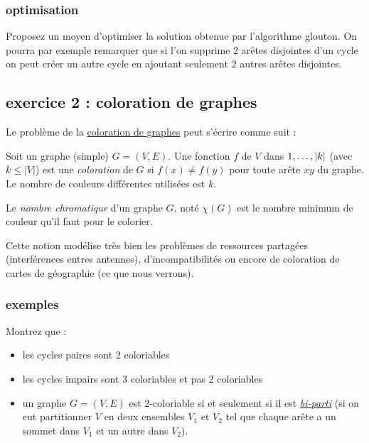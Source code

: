 \documentclass[
]{article}
\providecommand{\tightlist}{%
  \setlength{\itemsep}{0pt}\setlength{\parskip}{0pt}}
\begin{document}
\hypertarget{optimisation}{%
\subsubsection{optimisation}\label{optimisation}}

Proposez un moyen d'optimiser la solution obtenue par l'algorithme
glouton. On pourra par exemple remarquer que si l'on supprime 2 arêtes
disjointes d'un cycle on peut créer un autre cycle en ajoutant seulement
2 autres arêtes disjointes.

\hypertarget{exercice-2-coloration-de-graphes}{%
\subsection{exercice 2 : coloration de
graphes}\label{exercice-2-coloration-de-graphes}}

Le problème de la
\href{https://fr.wikipedia.org/wiki/Coloration_de_graphe}{coloration de
graphes} peut s'écrire comme suit :

Soit un graphe (simple) \(G = (V, E)\). Une fonction \(f\) de \(V\) dans
\(\\{1, \dots, \vert k \vert \\}\) (avec \(k \leq \vert V \vert\)) est
une \emph{coloration} de \(G\) si \(f(x) \neq f(y)\) pour toute arête
\(xy\) du graphe. Le nombre de couleurs différentes utilisées est \(k\).

Le \emph{nombre chromatique} d'un graphe \(G\), noté \(\chi(G)\) est le
nombre minimum de couleur qu'il faut pour le colorier.

Cette notion modélise très bien les problèmes de ressources partagées
(interférences entres antennes), d'incompatibilités ou encore de
coloration de cartes de géographie (ce que nous verrons).

\hypertarget{exemples}{%
\subsubsection{exemples}\label{exemples}}

Montrez que :

\begin{itemize}
\tightlist
\item
  les cycles paires sont 2 coloriables
\item
  les cycles impairs sont 3 coloriables et pas 2 coloriables
\item
  un graphe \(G=(V, E)\) est 2-coloriable si et seulement si il est
  \href{https://fr.wikipedia.org/wiki/Graphe_biparti}{\emph{bi-parti}}
  (si on eut partitionner \(V\) en deux ensembles \(V_1\) et \(V_2\) tel
  que chaque arête a un sommet dans \(V_1\) et un autre dans \(V_2\)).
\end{itemize}
\end{document}
